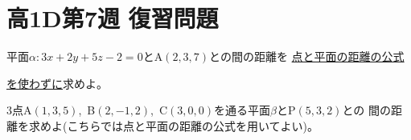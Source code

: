 \documentclass[dvipdfmx,uplatex,b5paper]{jsarticle}
\begin{document}
\section*{高1D第7週 復習問題}
\begin{enumarabicp}
  \item 平面$\alpha\colon 3x+2y+5z-2=0$とA$(2,3,7)$との間の距離を
  \underline{点と平面の距離の公式}
  
  \underline{を使わずに}求めよ。

  \item 3点A$(1,3,5)$,\ B$(2,-1,2)$,\ C$(3,0,0)$を通る平面$\beta$とP$(5,3,2)$との
  間の距離を求めよ(こちらでは点と平面の距離の公式を用いてよい)。
\end{enumarabicp}
\end{document}

